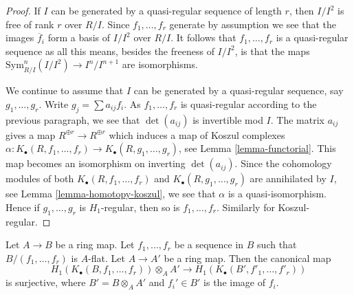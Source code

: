 \begin{proof}
If $I$ can be generated by a quasi-regular sequence of length $r$,
then $I/I^2$ is free of rank $r$ over $R/I$. Since $f_1, \ldots, f_r$
generate by assumption we see that the images $\overline{f}_i$ form a basis of
$I/I^2$ over $R/I$. It follows that $f_1, \ldots, f_r$ is a quasi-regular
sequence as all this means, besides the freeness of $I/I^2$, is that the maps
$\text{Sym}^n_{R/I}(I/I^2) \to I^n/I^{n + 1}$ are isomorphisms.

\medskip\noindent
We continue to assume that $I$ can be generated by a
quasi-regular sequence, say
$g_1, \ldots, g_r$. Write $g_j = \sum a_{ij}f_i$. As $f_1, \ldots, f_r$
is quasi-regular according to the previous paragraph, we see that
$\det(a_{ij})$ is invertible mod $I$. The matrix
$a_{ij}$ gives a map $R^{\oplus r} \to R^{\oplus r}$ which induces
a map of Koszul complexes
$\alpha : K_\bullet(R, f_1, \ldots, f_r) \to K_\bullet(R, g_1, \ldots, g_r)$,
see
Lemma \ref{lemma-functorial}.
This map becomes an isomorphism on inverting $\det(a_{ij})$.
Since the cohomology modules of both $K_\bullet(R, f_1, \ldots, f_r)$ and
$K_\bullet(R, g_1, \ldots, g_r)$ are annihilated by $I$, see
Lemma \ref{lemma-homotopy-koszul},
we see that $\alpha$ is a quasi-isomorphism. Hence if $g_1, \ldots, g_r$
is $H_1$-regular, then so is $f_1, \ldots, f_r$. Similarly
for Koszul-regular.
\end{proof}

\begin{lemma}
\label{lemma-base-change-H1-regular}
Let $A \to B$ be a ring map.
Let $f_1, \ldots, f_r$ be a sequence in $B$ such that $B/(f_1, \ldots, f_r)$
is $A$-flat. Let $A \to A'$ be a ring map. Then the canonical map
$$
H_1(K_\bullet(B, f_1, \ldots, f_r)) \otimes_A A'
\longrightarrow
H_1(K_\bullet(B', f'_1, \ldots, f'_r))
$$
is surjective, where $B' = B \otimes_A A'$ and $f_i' \in B'$ is the image
of $f_i$.
\end{lemma}

